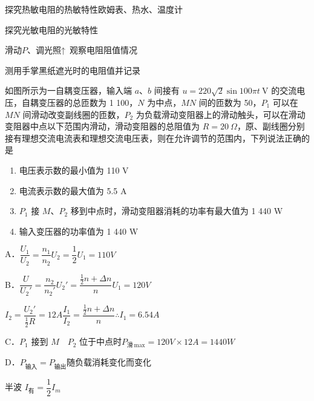 探究热敏电阻的热敏特性\quad 欧姆表、热水、温度计


探究光敏电阻的光敏特性


滑动$P$、调光照↑\ 观察电阻阻值情况

测用手掌黑纸遮光时的电阻值并记录
\begin{problem}
如图所示为一自耦变压器，输入端 $a$、$b$ 间接有 $u=220\sqrt{2}\sin 100\pi t\ \mathrm{V}$ 的交流电压，自耦变压器的总匝数为 1 100，$N$ 为中点，$MN$ 间的匝数为 50，$P_1$ 可以在 $MN$ 间滑动改变副线圈的匝数，$P_2$ 为负载滑动变阻器上的滑动触头，可以在滑动变阻器中点以下范围内滑动，滑动变阻器的总阻值为 $R=20\ \Omega$，原、副线圈分别接有理想交流电流表和理想交流电压表，则在允许调节的范围内，下列说法正确的是
\begin{enumerate}[label=\Alph*.,leftmargin=2em,itemsep=0pt]
\item 电压表示数的最小值为 110 V %
\item 电流表示数的最大值为 5.5 A
\item $P_1$ 接 $M$、$P_2$ 移到中点时，滑动变阻器消耗的功率有最大值为 1 440 W
\item 输入变压器的功率值为 1 440 W %
\end{enumerate}
\begin{solution}
A．$\dfrac{U_1}{U_2}=\dfrac{n_1}{n_2}$\qquad $U_2=\dfrac{1}{2}U_1=110\unit{V}$

B．$\dfrac{U}{U_2'}=\dfrac{n_2}{n_2'}$\qquad $U_2'=\dfrac{\frac{1}{2}n+\Delta n}{n}U_1=120\unit{V}$

$I_2=\dfrac{U_2'}{\frac{1}{2}R}=12\unit{A}$\qquad $\dfrac{I_1}{I_2}=\dfrac{\frac{1}{2}n+\Delta n}{n}$\qquad $\therefore I_1=6.54\unit{A}$

C．$P_1$ 接到 $M$　$P_2$ 位于中点时\quad $P_{\text{滑}\,\mathrm{max}}=120\unit{V}\times12\unit{A}=1440\unit{W}$

D．$P_{\text{输入}}=P_{\text{输出}}$\quad 随负载消耗变化而变化

\end{solution}
\end{problem}
半波 $I_{\text{有}}=\dfrac{1}{2}I_m$


